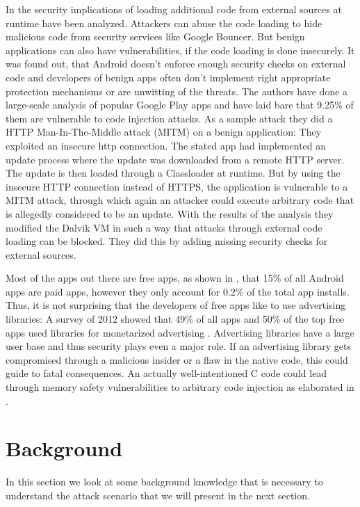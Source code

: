 In \cite{ExecuteThis} the security implications of loading additional code from external sources at runtime have been analyzed. Attackers can abuse the code loading to hide malicious code from security services like Google Bouncer. But benign applications can also have vulnerabilities, if the code loading is done insecurely. It was found out, that Android doesn't enforce enough security checks on external code and developers of benign apps often don't implement right appropriate protection mechanisms or are unwitting of the threats. The authors have done a large-scale analysis of popular Google Play apps and have laid bare that 9.25\% of them are vulnerable to code injection attacks. As a sample attack they did a HTTP Man-In-The-Middle attack (MITM) on a benign application:
They exploited an insecure http connection. The stated app had implemented an update process where the update was downloaded from a remote HTTP server. The update is then loaded through a Classloader at runtime. But by using the insecure HTTP connection instead of HTTPS, the application is vulnerable to a MITM attack, through which again an attacker could execute arbitrary code that is allegedly considered to be an update.
With the results of the analysis they modified the Dalvik VM in such a way that attacks through external code loading can be blocked. They did this by adding missing security checks for external sources.

Most of the apps out there are free apps, as shown in \cite[p. 164]{Wang:2017:ESM:3038912.3052712}, that 15\% of all Android apps are paid apps, however they only account for 0.2\% of the total app installs. 
Thus, it is not surprising that the developers of free apps like to use advertising libraries: A survey of 2012 showed that 49\% of all apps and 50\% of the top free apps used libraries for monetarized advertising \cite[p.7]{Pearce:2012:APS:2414456.2414498}. 
Advertising libraries have a large user base and thus security plays even a major role. 
If an advertising library gets compromised through a malicious insider or a flaw in the native code, this could guide to fatal consequences. 
An actually well-intentioned C code could lead through memory safety vulnerabilities to arbitrary code injection as elaborated in \cite{Szekeres:2013:SEW:2497621.2498101}.

\section{Background}

In this section we look at some background knowledge that is necessary to understand the attack scenario that we will present in the next section.
 
